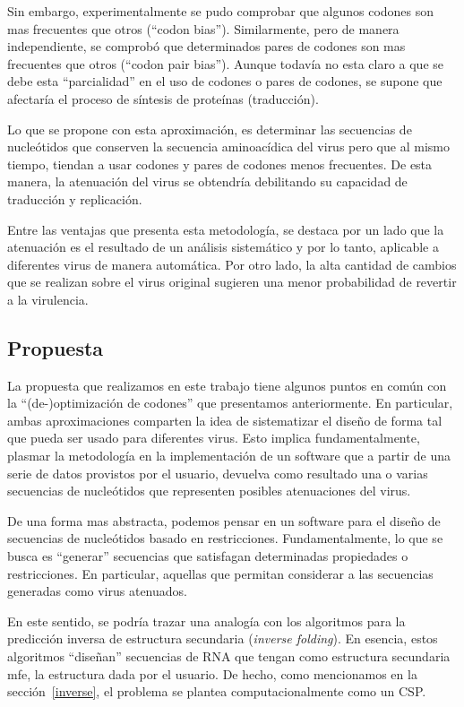 Sin embargo, experimentalmente se pudo comprobar que algunos codones son mas
frecuentes que otros (``codon bias''). Similarmente, pero de manera
independiente, se comprob\'o que determinados pares de codones son mas
frecuentes que otros (``codon pair bias''). Aunque todav\'ia no esta claro a que
se debe esta ``parcialidad'' en el uso de codones o pares de codones, se supone
que afectar\'ia el proceso de s\'intesis de prote\'inas
(traducci\'on). 

Lo que se propone con esta aproximaci\'on, es determinar las secuencias de
nucle\'otidos que conserven la secuencia aminoac\'idica del virus pero que al
mismo tiempo, tiendan a usar codones y pares de codones menos frecuentes. De
esta manera, la atenuaci\'on del virus se obtendr\'ia debilitando su capacidad
de traducci\'on y replicaci\'on. 

Entre las ventajas que presenta esta metodolog\'ia, se destaca por un lado que
la atenuaci\'on es el resultado de un an\'alisis sistem\'atico y por lo tanto,
aplicable a diferentes virus de manera autom\'atica. Por otro lado, la alta
cantidad de cambios que se realizan sobre el virus original sugieren una menor
probabilidad de revertir a la virulencia.

\subsection{Propuesta}

La propuesta que realizamos en este trabajo tiene algunos puntos en com\'un con
la ``(de-)optimizaci\'on de codones'' que presentamos anteriormente. En
particular, ambas aproximaciones comparten la idea de sistematizar el dise\~no
de forma tal que pueda ser usado para diferentes virus. Esto implica
fundamentalmente, plasmar la metodolog\'ia en la implementaci\'on de un software
que a partir de una serie de datos provistos por el usuario, devuelva como
resultado una o varias secuencias de nucle\'otidos que representen posibles
atenuaciones del virus.

De una forma mas abstracta, podemos pensar en un software para el dise\~no de
secuencias de nucle\'otidos basado en restricciones. Fundamentalmente, lo que se
busca es ``generar'' secuencias que satisfagan determinadas propiedades o
restricciones. En particular, aquellas que permitan considerar a las secuencias
generadas como virus atenuados.

En este sentido, se podr\'ia trazar una analog\'ia con los algoritmos para la
predicci\'on inversa de estructura secundaria (\textit{inverse folding}). En
esencia, estos algoritmos ``dise\~nan'' secuencias de \ac{RNA} que tengan como
estructura secundaria \ac{mfe}, la estructura dada por el usuario. De hecho,
como mencionamos en la secci\'on~\ref{inverse}, el problema se plantea
computacionalmente como un \ac{CSP}.

